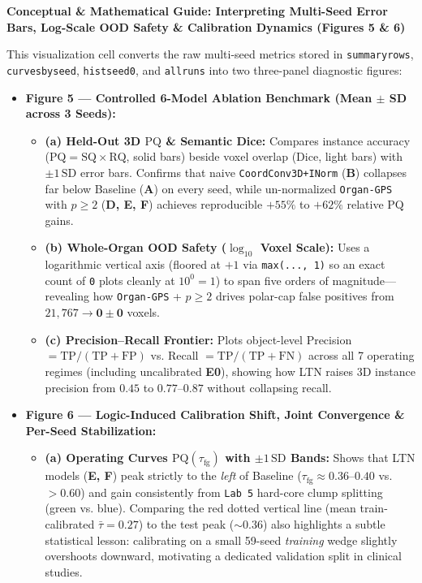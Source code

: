 \documentclass[10pt,a4paper]{article}
\renewcommand{\_}{\origunderscore\allowbreak}
\begin{document}
\begin{guidehdr}
{\small\bfseries\color{kiwigreen!75!black}Conceptual \& Mathematical Guide: Interpreting Multi-Seed Error Bars, Log-Scale OOD Safety \& Calibration Dynamics (Figures 5 \& 6)}
\end{guidehdr}

This visualization cell converts the raw multi-seed metrics stored in \texttt{summary\_rows}, \texttt{curves\_by\_seed}, \texttt{hist\_seed0}, and \texttt{all\_runs} into two three-panel diagnostic figures:

\begin{itemize}
\item \textbf{Figure 5 --- Controlled 6-Model Ablation Benchmark (Mean $\pm$ SD across 3 Seeds):}
\begin{itemize}
\item \textbf{(a) Held-Out 3D $\text{PQ}$ \& Semantic Dice:} Compares instance accuracy ($\text{PQ} = \text{SQ} \times \text{RQ}$, solid bars) beside voxel overlap (Dice, light bars) with $\pm 1\,\text{SD}$ error bars. Confirms that naive \texttt{CoordConv3D+INorm} (\textbf{B}) collapses far below Baseline (\textbf{A}) on every seed, while un-normalized \texttt{Organ-GPS} with $p \ge 2$ (\textbf{D, E, F}) achieves reproducible $+55\%$ to $+62\%$ relative $\text{PQ}$ gains.
\item \textbf{(b) Whole-Organ OOD Safety ($\log_{10}$ Voxel Scale):} Uses a logarithmic vertical axis (floored at $+1$ via \texttt{max(..., 1)} so an exact count of \texttt{0} plots cleanly at $10^0 = 1$) to span five orders of magnitude---revealing how \texttt{Organ-GPS} + $p \ge 2$ drives polar-cap false positives from $21{,}767 \to \mathbf{0 \pm 0}$ voxels.
\item \textbf{(c) Precision--Recall Frontier:} Plots object-level Precision $= \text{TP}/(\text{TP}+\text{FP})$ vs. Recall $= \text{TP}/(\text{TP}+\text{FN})$ across all 7 operating regimes (including uncalibrated \textbf{E0}), showing how LTN raises 3D instance precision from $0.45$ to $0.77$--$0.87$ without collapsing recall.
\end{itemize}
\item \textbf{Figure 6 --- Logic-Induced Calibration Shift, Joint Convergence \& Per-Seed Stabilization:}
\begin{itemize}
\item \textbf{(a) Operating Curves $\text{PQ}(\tau_{\text{fg}})$ with $\pm 1\,\text{SD}$ Bands:} Shows that LTN models (\textbf{E, F}) peak strictly to the \textit{left} of Baseline ($\tau_{\text{fg}} \approx 0.36$--$0.40$ vs. $>0.60$) and gain consistently from \texttt{Lab 5} hard-core clump splitting (green vs. blue). Comparing the red dotted vertical line (mean train-calibrated $\bar{\tau} = 0.27$) to the test peak ($\sim 0.36$) also highlights a subtle statistical lesson: calibrating on a small 59-seed \textit{training} wedge slightly overshoots downward, motivating a dedicated validation split in clinical studies.

\end{itemize}
\end{itemize}
\end{document}
